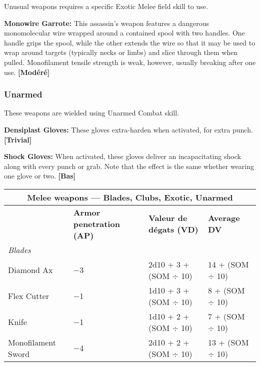 {{Unusual weapons requires a specific Exotic Melee field skill to use. 

\textbf{Monowire Garrote:} This assassin’s weapon features a dangerous monomolecular wire wrapped around a contained spool with two handles. One handle grips the spool, while the other extends the wire so that it may be used to wrap around targets (typically necks or limbs) and slice through them when pulled. Monofilament tensile strength is weak, however, usually breaking after one use. \textbf{[Modéré]} 

\subsubsection{Unarmed} 

These weapons are wielded using Unarmed Combat skill. 

\textbf{Densiplast Gloves:} These gloves extra-harden when activated, for extra punch. \textbf{[Trivial]} 

\textbf{Shock Gloves:} When activated, these gloves deliver an incapacitating shock along with every punch or grab. Note that the effect is the same whether wearing one glove or two. \textbf{[Bas]} 







\begin{table} \begin{tabularx}{\textwidth}{|l|X|l|l|} \hline

\multicolumn{4}{|c|}{\textbf{Melee weapons --- Blades, Clubs, Exotic, Unarmed}} \\ \hline

&\textbf{Armor penetration (AP)}	&\textbf{Valeur de dégats (VD)}	&\textbf{Average DV} \\ \hline

\multicolumn{4}{|l|}{\emph{Blades}} \\ \hline

Diamond Ax	&$-$3	&2d10 + 3 + (SOM $\div$ 10)	&14 + (SOM $\div$ 10) \\ \hline

Flex Cutter	&$-$1	&1d10 + 3 + (SOM $\div$ 10)	&8 + (SOM $\div$ 10) \\ \hline

Knife	&$-$1	&1d10 + 2 + (SOM $\div$ 10)	&7 + (SOM $\div$ 10) \\ \hline

Monofilament Sword	&$-$4	&2d10 + 2 + (SOM $\div$ 10)	&13 + (SOM $\div$ 10) \\ \hline


\end{tabularx}
\end{table}}}
